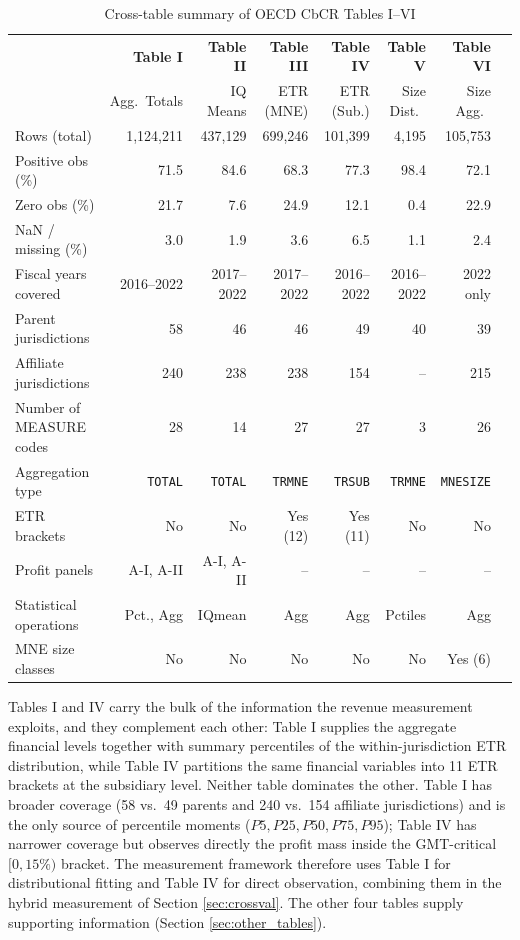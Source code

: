 \documentclass[11pt,a4paper]{article}
\newcommand{\code}[1]{\texttt{#1}}
\begin{document}
\begin{table}[H]
\centering
\caption{Cross-table summary of OECD CbCR Tables I--VI}
\label{tab:crosssummary}
\footnotesize
\begin{tabular}{@{}lrrrrrrr@{}}
\toprule
 & \textbf{Table I} & \textbf{Table II} & \textbf{Table III} & \textbf{Table IV} & \textbf{Table V} & \textbf{Table VI} \\
 & Agg.\ Totals & IQ Means & ETR (MNE) & ETR (Sub.) & Size Dist.\ & Size Agg.\ \\
\midrule
Rows (total) & 1,124,211 & 437,129 & 699,246 & 101,399 & 4,195 & 105,753 \\
Positive obs (\%) & 71.5 & 84.6 & 68.3 & 77.3 & 98.4 & 72.1 \\
Zero obs (\%) & 21.7 & 7.6 & 24.9 & 12.1 & 0.4 & 22.9 \\
NaN / missing (\%) & 3.0 & 1.9 & 3.6 & 6.5 & 1.1 & 2.4 \\
\addlinespace
Fiscal years covered & 2016--2022 & 2017--2022 & 2017--2022 & 2016--2022 & 2016--2022 & 2022 only \\
Parent jurisdictions & 58 & 46 & 46 & 49 & 40 & 39 \\
Affiliate jurisdictions & 240 & 238 & 238 & 154 & -- & 215 \\
Number of MEASURE codes & 28 & 14 & 27 & 27 & 3 & 26 \\
\addlinespace
Aggregation type & \code{TOTAL} & \code{TOTAL} & \code{TRMNE} & \code{TRSUB} & \code{TRMNE} & \code{MNESIZE} \\
ETR brackets & No & No & Yes (12) & Yes (11) & No & No \\
Profit panels & A-I, A-II & A-I, A-II & -- & -- & -- & -- \\
Statistical operations & Pct., Agg & IQmean & Agg & Agg & Pctiles & Agg \\
MNE size classes & No & No & No & No & No & Yes (6) \\
\bottomrule
\end{tabular}
\end{table}

Tables I and IV carry the bulk of the information the revenue measurement exploits, and they complement each other: Table I supplies the aggregate financial levels together with summary percentiles of the within-jurisdiction ETR distribution, while Table IV partitions the same financial variables into 11 ETR brackets at the subsidiary level. Neither table dominates the other. Table I has broader coverage (58 vs.\ 49 parents and 240 vs.\ 154 affiliate jurisdictions) and is the only source of percentile moments ($P5, P25, P50, P75, P95$); Table IV has narrower coverage but observes directly the profit mass inside the GMT-critical $[0, 15\%)$ bracket. The measurement framework therefore uses Table I for distributional fitting and Table IV for direct observation, combining them in the hybrid measurement of Section \ref{sec:crossval}. The other four tables supply supporting information (Section \ref{sec:other_tables}).
\end{document}
